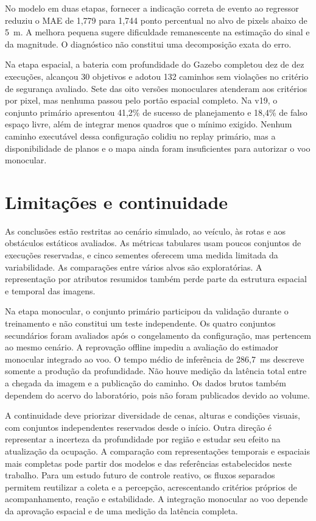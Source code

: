 No modelo em duas etapas, fornecer a indicação correta de evento ao regressor reduziu o MAE de 1,779 para 1,744 ponto percentual no alvo de pixels abaixo de 5~m. A melhora pequena sugere dificuldade remanescente na estimação do sinal e da magnitude. O diagnóstico não constitui uma decomposição exata do erro.

Na etapa espacial, a bateria com profundidade do Gazebo completou dez de dez execuções, alcançou 30 objetivos e adotou 132 caminhos sem violações no critério de segurança avaliado. Sete das oito versões monoculares atenderam aos critérios por pixel, mas nenhuma passou pelo portão espacial completo. Na v19, o conjunto primário apresentou 41,2\% de sucesso de planejamento e 18,4\% de falso espaço livre, além de integrar menos quadros que o mínimo exigido. Nenhum caminho executável dessa configuração colidiu no replay primário, mas a disponibilidade de planos e o mapa ainda foram insuficientes para autorizar o voo monocular.

\section{Limitações e continuidade}

As conclusões estão restritas ao cenário simulado, ao veículo, às rotas e aos obstáculos estáticos avaliados. As métricas tabulares usam poucos conjuntos de execuções reservadas, e cinco sementes oferecem uma medida limitada da variabilidade. As comparações entre vários alvos são exploratórias. A representação por atributos resumidos também perde parte da estrutura espacial e temporal das imagens.

Na etapa monocular, o conjunto primário participou da validação durante o treinamento e não constitui um teste independente. Os quatro conjuntos secundários foram avaliados após o congelamento da configuração, mas pertencem ao mesmo cenário. A reprovação offline impediu a avaliação do estimador monocular integrado ao voo. O tempo médio de inferência de 286,7~ms descreve somente a produção da profundidade. Não houve medição da latência total entre a chegada da imagem e a publicação do caminho. Os dados brutos também dependem do acervo do laboratório, pois não foram publicados devido ao volume.

A continuidade deve priorizar diversidade de cenas, alturas e condições visuais, com conjuntos independentes reservados desde o início. Outra direção é representar a incerteza da profundidade por região e estudar seu efeito na atualização da ocupação. A comparação com representações temporais e espaciais mais completas pode partir dos modelos e das referências estabelecidos neste trabalho. Para um estudo futuro de controle reativo, os fluxos separados permitem reutilizar a coleta e a percepção, acrescentando critérios próprios de acompanhamento, reação e estabilidade. A integração monocular ao voo depende da aprovação espacial e de uma medição da latência completa.


